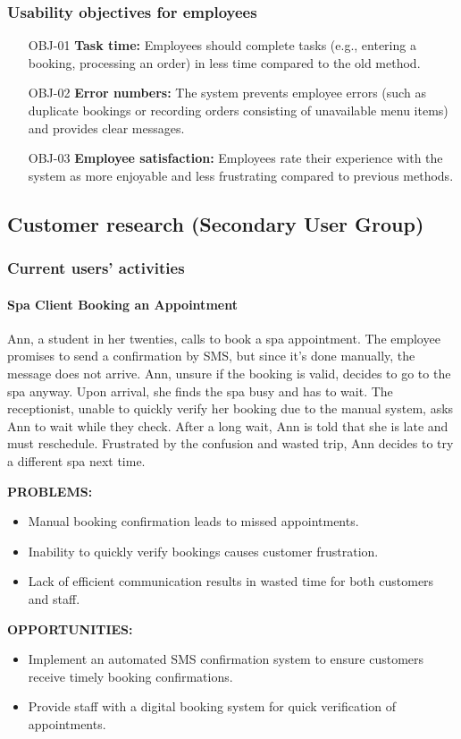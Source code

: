\documentclass[]{VUMIFTemplateClass}
\newcommand{\subsubsubsection}[1]{\paragraph{#1}}
\begin{document}
\subsubsection{Usability objectives for employees}
\begin{itemize}
    \item[OBJ-01] \textbf{Task time:} Employees should complete tasks (e.g., entering a booking, processing an order) in less time compared to the old method.
    \item[OBJ-02] \textbf{Error numbers:} The system prevents employee errors (such as duplicate bookings or recording orders consisting of unavailable menu items) and provides clear messages.
    \item[OBJ-03] \textbf{Employee satisfaction:} Employees rate their experience with the system as more enjoyable and less frustrating compared to previous methods.
\end{itemize}


\subsection{Customer research (Secondary User Group)}
\subsubsection{Current users' activities}

\subsubsubsection{Spa Client Booking an Appointment}
Ann, a student in her twenties, calls to book a spa appointment. The employee
promises to send a confirmation by SMS, but since it’s done manually, the
message does not arrive. Ann, unsure if the booking is valid, decides to go to
the spa anyway. Upon arrival, she finds the spa busy and has to wait. The
receptionist, unable to quickly verify her booking due to the manual system,
asks Ann to wait while they check. After a long wait, Ann is told that she is
late and must reschedule. Frustrated by the confusion and wasted trip, Ann
decides to try a different spa next time.

\textbf{PROBLEMS:}
\begin{itemize}
    \item Manual booking confirmation leads to missed appointments.
    \item Inability to quickly verify bookings causes customer frustration.
    \item Lack of efficient communication results in wasted time for both customers and staff.
\end{itemize}
\textbf{OPPORTUNITIES:}
\begin{itemize}
    \item Implement an automated SMS confirmation system to ensure customers receive timely booking confirmations.
    \item Provide staff with a digital booking system for quick verification of appointments.
\end{itemize}
\end{document}
